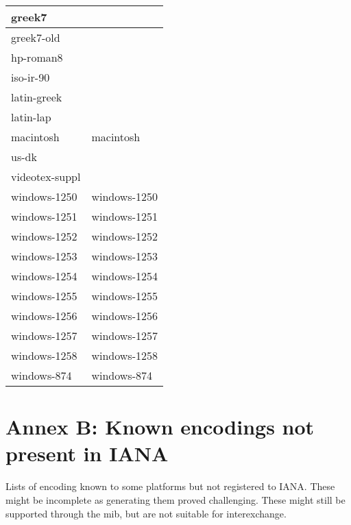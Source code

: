 \documentclass{wg21}
\begin{document}
\begin{longtable}{| p{} | p{} |}
greek7 & \\ \hline
greek7-old & \\ \hline
hp-roman8 & \\ \hline
iso-ir-90 & \\ \hline
latin-greek & \\ \hline
latin-lap & \\ \hline
macintosh & macintosh\\ \hline
us-dk & \\ \hline
videotex-suppl & \\ \hline
windows-1250 & windows-1250\\ \hline
windows-1251 & windows-1251\\ \hline
windows-1252 & windows-1252\\ \hline
windows-1253 & windows-1253\\ \hline
windows-1254 & windows-1254\\ \hline
windows-1255 & windows-1255\\ \hline
windows-1256 & windows-1256\\ \hline
windows-1257 & windows-1257\\ \hline
windows-1258 & windows-1258\\ \hline
windows-874 & windows-874\\ \hline
\end{longtable}

\section{Annex B: Known encodings not present in IANA}

Lists of encoding known to some platforms but not registered to IANA.
These might be incomplete as generating them proved challenging.
These might still be supported through the  mib, but are not
suitable for interexchange.
\end{document}
